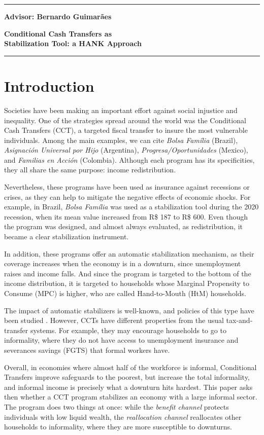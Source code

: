 \documentclass[12pt]{article}
\newcommand{\PaperType}{Advisor: Bernardo Guimarães}
\newcommand{\PaperTitle}{Conditional Cash Transfers as \\
                        Stabilization Tool: a HANK Approach}
\newcommand{\TitleBlock}{%
  \noindent\rule{\textwidth}{0.4pt}\par
  \begin{center}\small\bfseries \PaperType\end{center}
  \begin{center}\Large\bfseries \PaperTitle\end{center}
  \vspace{0.4cm}
}
\begin{document}
\thispagestyle{fancy}

\TitleBlock

\hrule
\vspace{1.0em}

\section{Introduction}

Societies have been making an important effort against social injustice and inequality.
One of the strategies spread around the world was the Conditional Cash Transfers (CCT),
a targeted fiscal transfer to insure the most vulnerable individuals. Among the main
examples, we can cite \textit{Bolsa Família} (Brazil), \textit{Asignación Universal
por Hijo} (Argentina), \textit{Progresa/Oportunidades} (Mexico), and \textit{Familias
en Acción} (Colombia). Although each program has its specificities, they all share the
same purpose: income redistribution.

Nevertheless, these programs have been used as insurance against recessions or crises,
as they can help to mitigate the negative effects of economic shocks. For example, in
Brazil, \textit{Bolsa Família} was used as a stabilization tool during the 2020 recession,
when its mean value increased from R\$ 187 to R\$ 600. Even though the program was designed,
and almost always evaluated, as redistribution, it became a clear stabilization instrument.

In addition, these programs offer an automatic stabilization mechanism, as their coverage
increases when the economy is in a downturn, since unemployment raises and income falls.
And since the program is targeted to the bottom of the income distribution, it is targeted
to households whose Marginal Propensity to Consume (MPC) is higher, who are called
Hand-to-Mouth (HtM) households. 

The impact of automatic stabilizers is well-known, and policies of this type have been
studied \parencite{mckay2016role}. However, CCTs have different properties from the
usual tax-and-transfer systems. For example, they may encourage households to go to
informality, where they do not have access to unemployment insurance and severances
savings (FGTS) that formal workers have.

Overall, in economies where almost half of the workforce is informal, Conditional
Transfers improve safeguards to the poorest, but increase the total informality, and
informal income is precisely what a downturn hits hardest. This paper asks then whether
a CCT program stabilizes an economy with a large informal sector. The program does two
things at once: while the \textit{benefit channel} protects individuals with low
liquid wealth, the \textit{reallocation channel} reallocates other households to
informality, where they are more susceptible to downturns.
\end{document}
